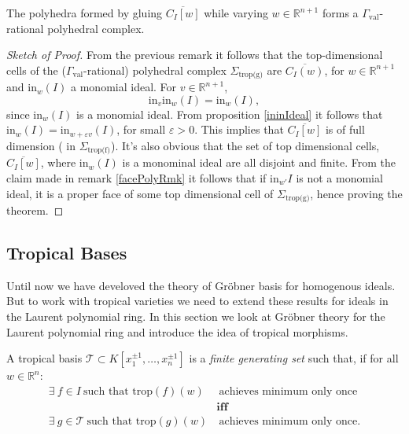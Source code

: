 \begin{theorem}
    \label{grobCompThe}
    The polyhedra formed by gluing $\overline{C_{I}[w]}$ while varying $w\in\mathbb{R}^{n+1}$ forms a $\Gamma_{\text{val}}$-rational polyhedral complex.
\end{theorem}
\begin{proof}[Sketch of Proof]
    From the previous remark it follows that the top-dimensional cells of the ($\Gamma_{\text{val}}$-rational) polyhedral complex $\Sigma_{\text{trop(g)}}$ are $\overline{C_{I}(w)}$, for $w \in \mathbb{R}^{n+1}$ and $\text{in}_{w}(I)$ a monomial ideal.
    For $v \in \mathbb{R}^{n+1}$,
    \[
        \text{in}_{v}\text{in}_{w}(I) = \text{in}_{w}(I),
    \]
    since $\text{in}_{w}(I)$ is a monomial ideal. 
    From proposition \ref{ininIdeal} it follows that $\text{in}_{w}(I) = \text{in}_{w + \varepsilon v}(I)$, for small $\varepsilon >0$.
    This implies that $\overline{C_{I}[w]}$ is of full dimension ( in $\Sigma_{\text{trop(f)}}$).
    It's also obvious that the set of top dimensional cells, $\overline{C_{I}[w]}$, where $\text{in}_{w}(I)$ is a monominal ideal are all disjoint and finite.
    From the claim made in remark \ref{facePolyRmk} it follows that if $\text{in}_{w'}I$ is not a monomial ideal, it is a proper face of some top dimensional cell of $\Sigma_{\text{trop(g)}}$, hence proving the theorem.
\end{proof}

\subsection{Tropical Bases}

Until now we have develoved the theory of Gr\"{o}bner basis for homogenous ideals.
But to work with tropical varieties we need to extend these results for ideals in the Laurent polynomial ring. 
In this section we look at Gr\"obner theory for the Laurent polynomial ring and introduce the idea of tropical morphisms.

A tropical basis $\mathcal{T}\subset K[x_1^{\pm 1}, \dots, x_n^{\pm 1}]$ is a \textit{finite generating set} such that, if for all $w \in \mathbb{R}^{n}$:
    \begin{align*}
        \exists ~f \in I~\text{such that }\text{trop}(f)(w)&~\text{achieves minimum only once}\\
                                                          & \textbf{iff}\\
        \exists ~g \in \mathcal{T}~\text{such that }\text{trop}(g)(w)&~\text{achieves minimum only once}.
    \end{align*}

